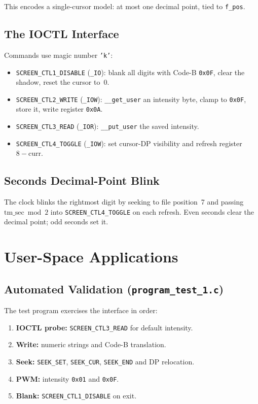 \documentclass[conference,a4paper]{IEEEtran}
\begin{document}
This encodes a single-cursor model: at most one decimal point, tied to \texttt{f\_pos}.

\subsection{The IOCTL Interface}

Commands use magic number \texttt{'k'}:
\begin{itemize}
    \item \texttt{SCREEN\_CTL1\_DISABLE} (\texttt{\_IO}): blank all digits with Code-B \texttt{0x0F}, clear the shadow, reset the cursor to~0.
    \item \texttt{SCREEN\_CTL2\_WRITE} (\texttt{\_IOW}): \texttt{\_\_get\_user} an intensity byte, clamp to \texttt{0x0F}, store it, write register \texttt{0x0A}.
    \item \texttt{SCREEN\_CTL3\_READ} (\texttt{\_IOR}): \texttt{\_\_put\_user} the saved intensity.
    \item \texttt{SCREEN\_CTL4\_TOGGLE} (\texttt{\_IOW}): set cursor-DP visibility and refresh register $8-\mathrm{curr}$.
\end{itemize}

\subsection{Seconds Decimal-Point Blink}

The clock blinks the rightmost digit by seeking to file position~7 and passing $\mathrm{tm\_sec} \bmod 2$ into \texttt{SCREEN\_CTL4\_TOGGLE} on each refresh. Even seconds clear the decimal point; odd seconds set it.

\section{User-Space Applications}
\label{sec:user}

\subsection{Automated Validation (\texttt{program\_test\_1.c})}

The test program exercises the interface in order:
\begin{enumerate}
    \item \textbf{IOCTL probe:} \texttt{SCREEN\_CTL3\_READ} for default intensity.
    \item \textbf{Write:} numeric strings and Code-B translation.
    \item \textbf{Seek:} \texttt{SEEK\_SET}, \texttt{SEEK\_CUR}, \texttt{SEEK\_END} and DP relocation.
    \item \textbf{PWM:} intensity \texttt{0x01} and \texttt{0x0F}.
    \item \textbf{Blank:} \texttt{SCREEN\_CTL1\_DISABLE} on exit.
\end{enumerate}
\end{document}
